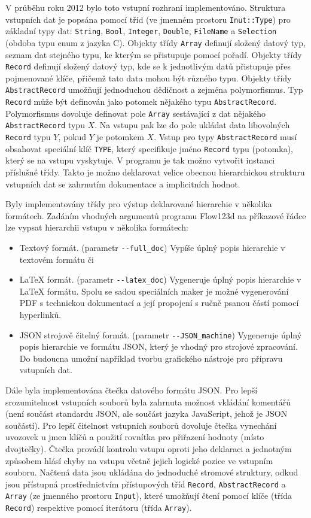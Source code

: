 \documentclass[11pt]{report}
\begin{document}
V průběhu roku 2012 bylo toto vstupní rozhraní implementováno. Struktura 
vstupních dat je popsána pomocí tříd (ve jmenném prostoru \verb'Inut::Type') 
pro základní typy dat: \verb'String', \verb'Bool', \verb'Integer', 
\verb'Double', \verb'FileName' a \verb'Selection' (obdoba typu enum z jazyka 
C). Objekty třídy \verb'Array' definují složený datový typ, seznam dat 
stejného typu, ke kterým se přistupuje pomocí pořadí. Objekty třídy 
\verb'Record' definují složený datový typ, kde se k jednotlivým datů přistupuje 
přes pojmenované klíče, přičemž tato data mohou být různého typu. Objekty třídy 
\verb'AbstractRecord' umožňují jednoduchou dědičnost a zejména polymorfismus. 
Typ \verb'Record' může být definován jako potomek nějakého typu 
\verb'AbstractRecord'. Polymorfismus dovoluje definovat pole 
\verb'Array' sestávající z dat nějakého \verb'AbstractRecord' typu $X$.
Na vstupu pak lze do pole ukládat data libovolných 
\verb'Record' typu $Y$, pokud $Y$ je potomkem $X$. Vstup pro typy 
\verb'AbstractRecord' musí obsahovat speciální klíč \verb'TYPE', který 
specifikuje jméno \verb'Record' typu (potomka), který se na vstupu vyskytuje. 
V programu je tak možno vytvořit instanci příslušné třídy.
Takto je možno deklarovat velice obecnou hierarchickou strukturu vstupních dat 
se zahrnutím dokumentace a implicitních hodnot.

Byly implementovány třídy pro výstup deklarované hierarchie v několika 
formátech. Zadáním vhodných argumentů programu Flow123d na příkazové řádce
lze vypsat hierarchii vstupu v několika formátech:
\begin{itemize}
 \item Textový formát. (parametr \verb'--full_doc') Vypíše úplný popis 
hierarchie v textovém formátu či
 \item LaTeX formát. (parametr \verb'--latex_doc') Vygeneruje úplný popis 
hierarchie v LaTeX formátu. Spolu se sadou speciálních maker je možné 
vygenerování PDF s technickou dokumentací a její propojení s ručně psanou částí 
pomocí hyperlinků. 
 \item JSON strojově čitelný formát. (parametr \verb'--JSON_machine') Vygeneruje 
úplný popis hierarchie ve formátu JSON, který je vhodný pro strojové 
zpracování. Do budoucna umožní například tvorbu grafického nástroje pro 
přípravu vstupních dat.
\end{itemize}


Dále byla implementována čtečka datového formátu JSON. Pro lepší srozumitelnost 
vstupních souborů byla zahrnuta možnost vkládání komentářů (není součást 
standardu JSON, ale součást jazyka JavaScript, jehož je JSON součástí). 
Pro lepší čitelnost vstupních souborů dovoluje čtečka vynechání uvozovek u 
jmen klíčů a použití rovnítka pro přiřazení hodnoty (místo dvojtečky).
Čtečka provádí kontrolu vstupu oproti jeho deklaraci a jednotným způsobem hlásí 
chyby na vstupu včetně jejich logické pozice ve vstupním souboru. Načtená data 
jsou ukládána do jednoduché stromové struktury, odkud jsou přístupná 
prostřednictvím přístupových tříd \verb'Record', \verb'AbstractRecord' a 
\verb'Array' (ze jmenného prostoru \verb'Input'), které umožňují čtení pomocí 
klíče (třída \verb'Record') respektive pomocí iterátoru (třída \verb'Array').
\end{document}
